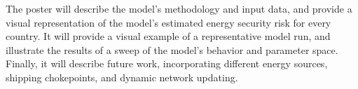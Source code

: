 \documentclass{article}
\begin{document}
The poster will describe the model's methodology and input data, and provide a visual representation of the model's estimated energy security risk for every country. It will provide a visual example of a representative model run, and illustrate the results of a sweep of the model's behavior and parameter space. Finally, it will describe future work, incorporating different energy sources, shipping chokepoints, and dynamic network updating.

 

\end{document}

